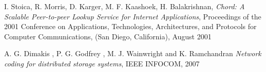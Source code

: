 \documentclass[journal]{IEEEtran}
\begin{document}




\begin{thebibliography}{1}

 
\bibitem{}
I. Stoica, R. Morris, D. Karger, M. F. Kaashoek, H. Balakrishnan, \emph{Chord: A Scalable Peer-to-peer Lookup Service for Internet Applications}, Proceedings of the 2001 Conference on Applications, Technologies, Architectures, and Protocols for Computer Communications, (San Diego, California), August 2001

\bibitem{}
A. G. Dimakis , P. G. Godfrey , M. J. Wainwright and K. Ramchandran  \emph{Network coding for distributed storage systems},  IEEE INFOCOM,  2007 


\end{thebibliography}
\end{document}

